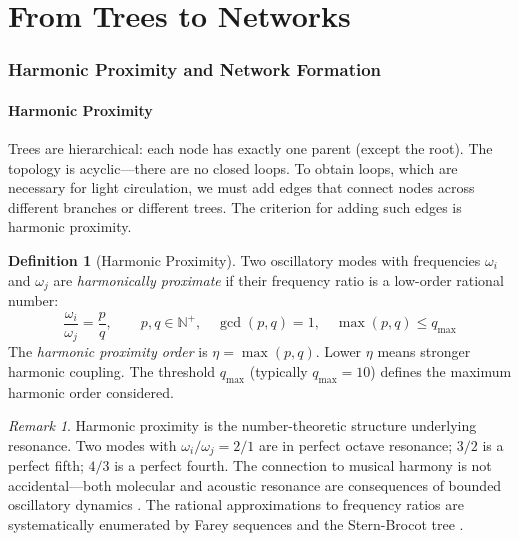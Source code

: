 \documentclass[11pt,a4paper]{article}
\theoremstyle{definition}
\newtheorem{definition}[theorem]{Definition}
\theoremstyle{remark}
\newtheorem{remark}[theorem]{Remark}
\newcommand{\Natural}{\mathbb{N}}
\newcommand{\qmax}{q_{\mathrm{max}}}
\begin{document}

\part{From Trees to Networks}

\section{Harmonic Proximity and Network Formation}
\label{sec:harmonic_network}

\subsection{Harmonic Proximity}

Trees are hierarchical: each node has exactly one parent (except the root). The topology is acyclic---there are no closed loops. To obtain loops, which are necessary for light circulation, we must add edges that connect nodes across different branches or different trees. The criterion for adding such edges is harmonic proximity.

\begin{definition}[Harmonic Proximity]
\label{def:harmonic_proximity}
Two oscillatory modes with frequencies $\omega_i$ and $\omega_j$ are \emph{harmonically proximate} if their frequency ratio is a low-order rational number:
\begin{equation}
\frac{\omega_i}{\omega_j} = \frac{p}{q}, \qquad p, q \in \Natural^+, \quad \gcd(p, q) = 1, \quad \max(p, q) \leq \qmax
\label{eq:harmonic_proximity}
\end{equation}
The \emph{harmonic proximity order} is $\eta = \max(p, q)$. Lower $\eta$ means stronger harmonic coupling. The threshold $\qmax$ (typically $\qmax = 10$) defines the maximum harmonic order considered.
\end{definition}

\begin{remark}
Harmonic proximity is the number-theoretic structure underlying resonance. Two modes with $\omega_i/\omega_j = 2/1$ are in perfect octave resonance; $3/2$ is a perfect fifth; $4/3$ is a perfect fourth. The connection to musical harmony is not accidental---both molecular and acoustic resonance are consequences of bounded oscillatory dynamics \citep{strogatz2015}. The rational approximations to frequency ratios are systematically enumerated by Farey sequences and the Stern-Brocot tree \citep{hardy1979}.
\end{remark}
\end{document}
